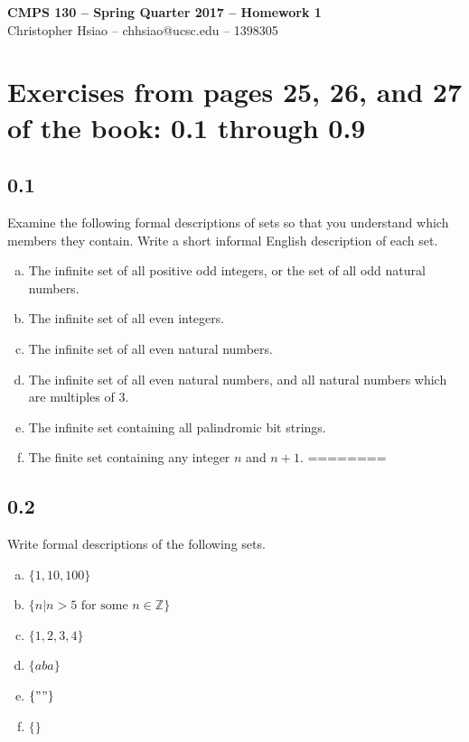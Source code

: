 \documentclass[11pt]{article}
\begin{document}
\begin{center}
{\bf\Large CMPS 130 -- Spring Quarter 2017 --  Homework 1}\\
Christopher Hsiao -- chhsiao@ucsc.edu -- 1398305\\
\end{center}



\section{Exercises from pages 25, 26, and 27 of the book: 0.1 through 0.9}
\subsection*{0.1} 
Examine the following formal descriptions of sets so that you understand which members they contain. Write a short informal English description of each set.

\begin{enumerate}[a.]
\item The infinite set of all positive odd integers, or the set of all odd natural numbers.
\item The infinite set of all even integers.
\item The infinite set of all even natural numbers.
\item The infinite set of all even natural numbers, and all natural numbers which are multiples of 3.
\item The infinite set containing all palindromic bit strings.
\item The finite set containing any integer $n$ and $n+1$. ========
\end{enumerate}

\subsection*{0.2}
Write formal descriptions of the following sets.

\begin{enumerate}[a.]
\item $\{1, 10, 100\}$
\item $\{n | n > 5 \text{ for some } n \in \mathbb{Z}\}$
\item $\{1, 2, 3, 4\}$
\item $\{aba\}$
\item $\{""\}$
\item $\{ \}$
\end{enumerate}
\end{document}
